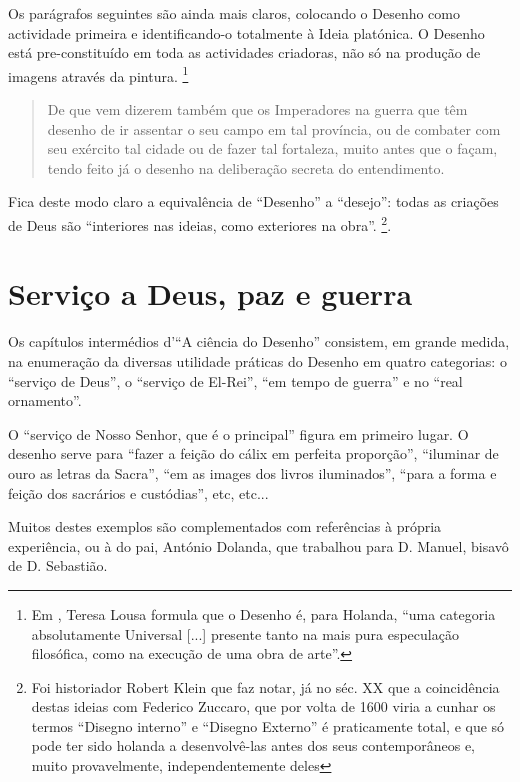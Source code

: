 \documentclass{article}
\begin{document}
Os parágrafos seguintes são ainda mais claros, colocando o Desenho
como actividade primeira e identificando-o totalmente à Ideia
platónica. O Desenho está pre-constituído em toda as actividades
criadoras, não só na produção de imagens através da
pintura. \footnote{Em \cite{teresa}, Teresa Lousa formula que o
  Desenho é, para Holanda, ``uma categoria absolutamente Universal
  [...] presente tanto na mais pura especulação filosófica, como na
  execução de uma obra de arte''.}

\begin{quote}
  De que vem dizerem também que os Imperadores na guerra que têm
  desenho de ir assentar o seu campo em tal província, ou de combater
  com seu exército tal cidade ou de fazer tal fortaleza, muito antes
  que o façam, tendo feito já o desenho na deliberação secreta do
  entendimento.
\end{quote}\cite[fl.37v]{holanda}

Fica deste modo claro a equivalência de ``Desenho'' a ``desejo'':
todas as criações de Deus são ``interiores nas ideias, como exteriores
na obra''\cite[fl.37v]{holanda}. \footnote{Foi historiador Robert
  Klein que faz notar, já no séc. XX que a coincidência destas ideias
  com Federico Zuccaro, que por volta de 1600 viria a cunhar os termos
  ``Disegno interno'' e ``Disegno Externo'' é praticamente total, e
  que só pode ter sido holanda a desenvolvê-las antes dos seus
  contemporâneos e, muito provavelmente, independentemente deles}.

\section{Serviço a Deus, paz e guerra }

Os capítulos intermédios d'``A ciência do Desenho'' consistem, em
grande medida, na enumeração da diversas utilidade práticas do Desenho
em quatro categorias: o ``serviço de Deus'', o ``serviço de El-Rei'',
``em tempo de guerra'' e no ``real ornamento''.

O ``serviço de Nosso Senhor, que é o principal''\cite[fl.38r]{holanda}
figura em primeiro lugar. O desenho serve para ``fazer a feição do
cálix em perfeita proporção'', ``iluminar de ouro as letras da
Sacra'', ``em as images dos livros iluminados'', ``para a forma e
feição dos sacrários e custódias'', etc, etc...

Muitos destes exemplos são complementados com referências à própria
experiência, ou à do pai, António Dolanda, que trabalhou para
D. Manuel, bisavô de D. Sebastião.
\end{document}
